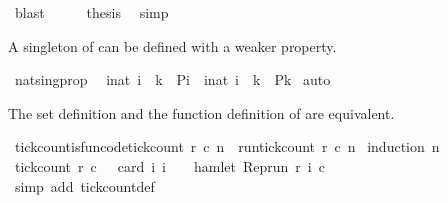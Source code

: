 \begin{isabellebody}
\ blast\isanewline
\ \ \isamarkupfalse%
\ \isamarkupfalse%
\ {\isacharquery}thesis\ \isamarkupfalse%
\ simp\isanewline
{}\isamarkupfalse%
%
\endisatagproof
{\isafoldproof}%
%
\isadelimproof
%
\endisadelimproof
%
\begin{isamarkuptext}%
A singleton of  can be defined with a weaker property.%
\end{isamarkuptext}\isamarkuptrue%
\isamarkupfalse%
\ nat{\isacharunderscore}sing{\isacharunderscore}prop{\isacharcolon}\isanewline
\ \ {\isacartoucheopen}{\isacharbraceleft}i{\isacharcolon}{\isacharcolon}nat{\isachardot}\ i\ {\isacharequal}\ k\ {\isasymand}\ P{\isacharparenleft}i{\isacharparenright}{\isacharbraceright}\ {\isacharequal}\ {\isacharbraceleft}i{\isacharcolon}{\isacharcolon}nat{\isachardot}\ i\ {\isacharequal}\ k\ {\isasymand}\ P{\isacharparenleft}k{\isacharparenright}{\isacharbraceright}{\isacartoucheclose}\isanewline
%
\isadelimproof
%
\endisadelimproof
%
\isatagproof
{}\isamarkupfalse%
\ auto%
\endisatagproof
{\isafoldproof}%
%
\isadelimproof
%
\endisadelimproof
%
\begin{isamarkuptext}%
The set definition and the function definition of  are equivalent.%
\end{isamarkuptext}\isamarkuptrue%
\isamarkupfalse%
\ tick{\isacharunderscore}count{\isacharunderscore}is{\isacharunderscore}fun{\isacharbrackleft}code{\isacharbrackright}{\isacharcolon}{\isacartoucheopen}tick{\isacharunderscore}count\ r\ c\ n\ {\isacharequal}\ run{\isacharunderscore}tick{\isacharunderscore}count\ r\ c\ n{\isacartoucheclose}\isanewline
%
\isadelimproof
%
\endisadelimproof
%
\isatagproof
{}\isamarkupfalse%
\ {\isacharparenleft}induction\ n{\isacharparenright}\isanewline
\ \ \isamarkupfalse%
\ {}\isanewline
\ \ \ \ \isamarkupfalse%
\ {\isacartoucheopen}tick{\isacharunderscore}count\ r\ c\ {}\ {\isacharequal}\ card\ {\isacharbraceleft}i{\isachardot}\ i\ {\isasymle}\ {}\ {\isasymand}\ hamlet\ {\isacharparenleft}{\isacharparenleft}Rep{\isacharunderscore}run\ r{\isacharparenright}\ i\ c{\isacharparenright}{\isacharbraceright}{\isacartoucheclose}\isanewline
\ \ \ \ \ \ \isamarkupfalse%
\ {\isacharparenleft}simp\ add{\isacharcolon}\ tick{\isacharunderscore}count{\isacharunderscore}def{\isacharparenright}\isanewline
\ \ \ \ \isamarkupfalse%
\ \isamarkupfalse%

\end{isabellebody}
